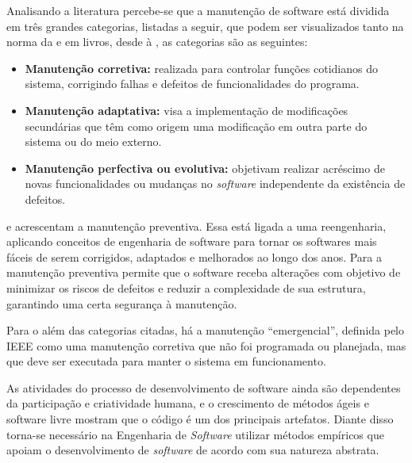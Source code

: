 
Analisando a literatura percebe-se que a manutenção de software está dividida em três grandes categorias, listadas a seguir, que podem ser visualizados tanto na norma da  e em livros, desde  à , as categorias são as seguintes:
\begin{itemize}
\item \textbf{Manutenção corretiva:} realizada para controlar funções cotidianos do sistema, corrigindo falhas e defeitos de funcionalidades do programa.

\item \textbf{Manutenção adaptativa:} visa a implementação de modificações secundárias que têm como origem uma modificação em outra parte do sistema ou do meio externo.

\item \textbf{Manutenção perfectiva ou evolutiva:} objetivam realizar acréscimo de novas funcionalidades ou mudanças no \textit{software} independente da existência de defeitos.
\end{itemize}

 e  acrescentam a manutenção preventiva. Essa está ligada a uma reengenharia, aplicando conceitos de engenharia de software para tornar os softwares mais fáceis de serem corrigidos, adaptados e melhorados ao longo dos anos. Para  a manutenção preventiva permite que o software receba alterações com objetivo de minimizar os riscos de defeitos e reduzir a complexidade de sua estrutura, garantindo uma certa segurança à manutenção.


Para o  além das categorias citadas, há a manutenção ``emergencial'', definida pelo IEEE como uma manutenção corretiva que não foi programada ou planejada, mas que deve ser executada para manter o sistema em funcionamento.

As atividades do processo de desenvolvimento de software ainda são dependentes da participação e criatividade humana, e o crescimento de métodos ágeis e software livre mostram que o código é um dos principais artefatos. Diante disso torna-se necessário na Engenharia de \textit{Software} utilizar métodos empíricos que apoiam o desenvolvimento de \textit{software} de acordo com sua natureza abstrata.

